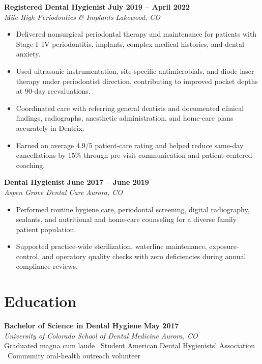 \documentclass[10pt,letterpaper]{article}
\newcommand{\job}[4]{%
  \textbf{#1} \hfill \textbf{#2}\\[-1pt]
  \textit{\color{deepteal}#3} \hfill \textit{\color{muted}#4}\par
}
\begin{document}
\vspace{2pt}
\job{Registered Dental Hygienist}{July 2019 -- April 2022}{Mile High Periodontics \& Implants}{Lakewood, CO}
\begin{itemize}
  \item Delivered nonsurgical periodontal therapy and maintenance for patients with Stage I--IV periodontitis, implants, complex medical histories, and dental anxiety.
  \item Used ultrasonic instrumentation, site-specific antimicrobials, and diode laser therapy under periodontist direction, contributing to improved pocket depths at 90-day reevaluations.
  \item Coordinated care with referring general dentists and documented clinical findings, radiographs, anesthetic administration, and home-care plans accurately in Dentrix.
  \item Earned an average 4.9/5 patient-care rating and helped reduce same-day cancellations by 15\% through pre-visit communication and patient-centered coaching.
\end{itemize}

\vspace{2pt}
\job{Dental Hygienist}{June 2017 -- June 2019}{Aspen Grove Dental Care}{Aurora, CO}
\begin{itemize}
  \item Performed routine hygiene care, periodontal screening, digital radiography, sealants, and nutritional and home-care counseling for a diverse family patient population.
  \item Supported practice-wide sterilization, waterline maintenance, exposure-control, and operatory quality checks with zero deficiencies during annual compliance reviews.
\end{itemize}

\section*{Education}
\textbf{Bachelor of Science in Dental Hygiene} \hfill \textbf{May 2017}\\[-1pt]
\textit{University of Colorado School of Dental Medicine} \hfill \textit{Aurora, CO}\\[1pt]
\small\color{muted}Graduated magna cum laude \textbullet\ Student American Dental Hygienists' Association \textbullet\ Community oral-health outreach volunteer
\end{document}
